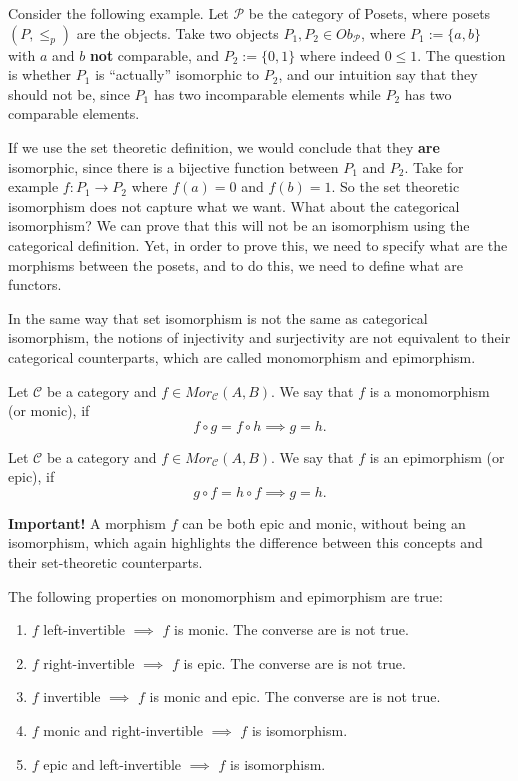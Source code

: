 Consider the following example.
Let $\mathcal P$ be the category of Posets, where posets $(P,\leq_p)$ are the objects.
Take two objects $P_1, P_2 \in Ob_\mathcal P$,
where $P_1:=\{a,b\}$ with $a$ and $b$ \textbf{not} comparable,
and $P_2:=\{0,1\}$ where indeed $0 \leq 1$. The question is whether $P_1$ is ``actually'' isomorphic
to $P_2$, and our intuition say that they should not be, since
$P_1$ has two incomparable elements while $P_2$ has two comparable elements.

If we use the set theoretic definition, we would conclude that they \textbf{are} isomorphic,
since there is a bijective function between $P_1$ and $P_2$.
Take for example $f:P_1\to P_2$ where $f(a)=0$ and $f(b)=1$.
So the set theoretic isomorphism does not capture what we want. What about the categorical isomorphism?
We can prove that this will not be an isomorphism using the categorical definition. Yet,
in order to prove this, we need to specify what are the morphisms between the posets,
and to do this, we need to define what are functors.

In the same way that set isomorphism is not the same as categorical isomorphism,
the notions of injectivity and surjectivity are not equivalent to their categorical
counterparts, which are called monomorphism and epimorphism.

\begin{definition}[Monomorphism]
	Let $\mathcal C$ be a category and $f \in Mor_\mathcal C(A,B)$. We say that
	$f$ is a monomorphism (or monic), if
	\begin{displaymath}
		f \circ g = f \circ h \implies g = h.
	\end{displaymath}
\end{definition}

\begin{definition}[Epimorphism]
	Let $\mathcal C$ be a category and $f \in Mor_\mathcal C(A,B)$. We say that
	$f$ is an epimorphism (or epic), if
	\begin{displaymath}
		g \circ f = h \circ f \implies g = h.
	\end{displaymath}
\end{definition}
\textbf{Important!} A morphism $f$ can be both epic and monic, without being
an isomorphism, which again highlights the difference between this concepts and their
set-theoretic counterparts.

\begin{proposition}
	The following properties on monomorphism and epimorphism are true:
	\begin{enumerate}[1.]
		\item $f$ left-invertible $\implies$ $f$ is monic. The converse are is not true.
		\item $f$ right-invertible $\implies$ $f$ is epic. The converse are is not true.
		\item $f$ invertible $\implies$ $f$ is monic and epic. The converse are is not true.
		\item $f$ monic and right-invertible $\implies $ $f$ is isomorphism.
		\item $f$ epic and left-invertible $\implies $ $f$ is isomorphism.
	\end{enumerate}
\end{proposition}

